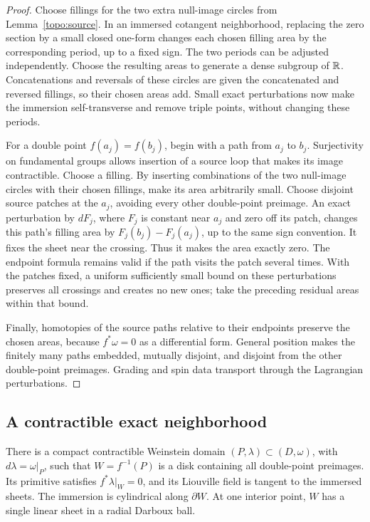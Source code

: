 \begin{proof}
Choose fillings for the two extra null-image circles from
Lemma~\ref{topo:source}.  In an immersed cotangent neighborhood,
replacing the zero section by a small closed one-form changes each
chosen filling area by the corresponding period, up to a fixed
sign.  The two periods can be adjusted independently.  Choose
the resulting areas to generate a dense subgroup of $\mathbb R$.
Concatenations and reversals of these circles are given the
concatenated and reversed fillings, so their chosen areas add.
Small exact perturbations now make the immersion self-transverse
and remove triple points, without changing these periods.

For a double point $f(a_j)=f(b_j)$, begin with a path from $a_j$
to $b_j$.  Surjectivity on fundamental groups allows insertion of
a source loop that makes its image contractible.  Choose a filling.
By inserting combinations of the two null-image circles with their
chosen fillings, make its area arbitrarily small.  Choose disjoint
source patches at the $a_j$, avoiding every other double-point
preimage.  An exact perturbation by $dF_j$, where $F_j$ is constant
near $a_j$ and zero off its patch, changes this path's filling area
by $F_j(b_j)-F_j(a_j)$, up to the same sign convention.  It fixes
the sheet near the crossing.  Thus it makes the area exactly zero.
The endpoint formula remains valid if the path visits the patch
several times.  With the patches fixed, a uniform sufficiently
small bound on these perturbations preserves all crossings and
creates no new ones; take the preceding residual areas within that
bound.

Finally, homotopies of the source paths relative to their endpoints
preserve the chosen areas, because $f^*\omega=0$ as a differential
form.  General position makes the finitely many paths embedded,
mutually disjoint, and disjoint from the other double-point
preimages.  Grading and spin data transport through the
Lagrangian perturbations.
\end{proof}

\subsection{A contractible exact neighborhood}

\begin{lemma}\label{topo:exact-domain}
There is a compact contractible Weinstein domain
$(P,\lambda)\subset(D,\omega)$, with $d\lambda=\omega|_P$, such that
$W=f^{-1}(P)$ is a disk
containing all double-point preimages.  Its primitive satisfies
$f^*\lambda|_W=0$, and its Liouville field is tangent to the
immersed sheets.  The immersion is cylindrical along $\partial W$.
At one interior point, $W$ has a single linear sheet in a radial
Darboux ball.
\end{lemma}

